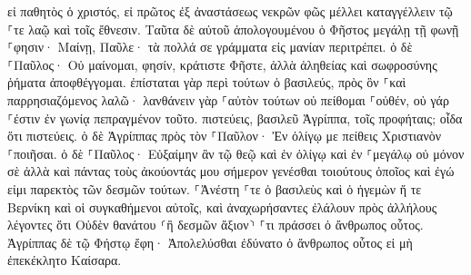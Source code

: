 \documentclass[twoside, 9pt]{extreport}
\begin{document}
εἰ παθητὸς ὁ χριστός, εἰ πρῶτος ἐξ ἀναστάσεως νεκρῶν φῶς μέλλει καταγγέλλειν τῷ ⸀τε λαῷ καὶ τοῖς ἔθνεσιν. 
Ταῦτα δὲ αὐτοῦ ἀπολογουμένου ὁ Φῆστος μεγάλῃ τῇ φωνῇ ⸀φησιν· Μαίνῃ, Παῦλε· τὰ πολλά σε γράμματα εἰς μανίαν περιτρέπει. 
ὁ δὲ ⸀Παῦλος· Οὐ μαίνομαι, φησίν, κράτιστε Φῆστε, ἀλλὰ ἀληθείας καὶ σωφροσύνης ῥήματα ἀποφθέγγομαι. 
ἐπίσταται γὰρ περὶ τούτων ὁ βασιλεύς, πρὸς ὃν ⸀καὶ παρρησιαζόμενος λαλῶ· λανθάνειν γὰρ ⸀αὐτὸν τούτων οὐ πείθομαι ⸀οὐθέν, οὐ γάρ ⸀ἐστιν ἐν γωνίᾳ πεπραγμένον τοῦτο. 
πιστεύεις, βασιλεῦ Ἀγρίππα, τοῖς προφήταις; οἶδα ὅτι πιστεύεις. 
ὁ δὲ Ἀγρίππας πρὸς τὸν ⸀Παῦλον· Ἐν ὀλίγῳ με πείθεις Χριστιανὸν ⸀ποιῆσαι. 
ὁ δὲ ⸀Παῦλος· Εὐξαίμην ἂν τῷ θεῷ καὶ ἐν ὀλίγῳ καὶ ἐν ⸀μεγάλῳ οὐ μόνον σὲ ἀλλὰ καὶ πάντας τοὺς ἀκούοντάς μου σήμερον γενέσθαι τοιούτους ὁποῖος καὶ ἐγώ εἰμι παρεκτὸς τῶν δεσμῶν τούτων. 
⸀Ἀνέστη ⸀τε ὁ βασιλεὺς καὶ ὁ ἡγεμὼν ἥ τε Βερνίκη καὶ οἱ συγκαθήμενοι αὐτοῖς, 
καὶ ἀναχωρήσαντες ἐλάλουν πρὸς ἀλλήλους λέγοντες ὅτι Οὐδὲν θανάτου ⸂ἢ δεσμῶν ἄξιον⸃ ⸀τι πράσσει ὁ ἄνθρωπος οὗτος. 
Ἀγρίππας δὲ τῷ Φήστῳ ἔφη· Ἀπολελύσθαι ἐδύνατο ὁ ἄνθρωπος οὗτος εἰ μὴ ἐπεκέκλητο Καίσαρα. 
\end{document}
